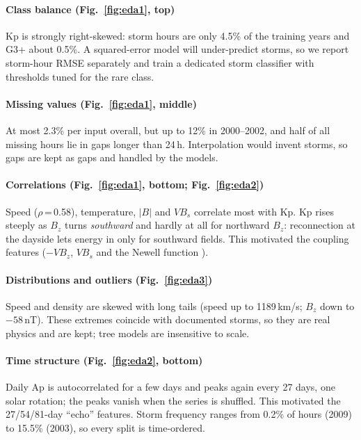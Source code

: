 \documentclass[conference,a4paper]{IEEEtran}
\begin{document}
\paragraph{Class balance (Fig.~\ref{fig:eda1}, top)} Kp is strongly right-skewed: storm hours are only 4.5\% of the
training years and G3+ about 0.5\%. A squared-error model will under-predict storms, so we report storm-hour RMSE
separately and train a dedicated storm classifier with thresholds tuned for the rare class.

\paragraph{Missing values (Fig.~\ref{fig:eda1}, middle)} At most 2.3\% per input overall, but up to 12\% in
2000--2002, and half of all missing hours lie in gaps longer than 24\,h. Interpolation would invent storms, so gaps
are kept as gaps and handled by the models.

\paragraph{Correlations (Fig.~\ref{fig:eda1}, bottom; Fig.~\ref{fig:eda2})} Speed ($\rho$\,=\,0.58), temperature,
$|B|$ and $VB_s$ correlate most with Kp. Kp rises steeply as $B_z$ turns \emph{southward} and hardly at all for
northward $B_z$: reconnection at the dayside lets energy in only for southward fields. This motivated the coupling
features ($-VB_z$, $VB_s$ and the Newell function \cite{newell2007}).

\paragraph{Distributions and outliers (Fig.~\ref{fig:eda3})} Speed and density are skewed with long tails (speed
up to 1189\,km/s; $B_z$ down to $-58$\,nT). These extremes coincide with documented storms, so they are real physics
and are kept; tree models are insensitive to scale.

\paragraph{Time structure (Fig.~\ref{fig:eda2}, bottom)} Daily Ap is autocorrelated for a few days and peaks again
every 27 days, one solar rotation; the peaks vanish when the series is shuffled. This motivated the 27/54/81-day
``echo'' features. Storm frequency ranges from 0.2\% of hours (2009) to 15.5\% (2003), so every split is
time-ordered.
\end{document}
